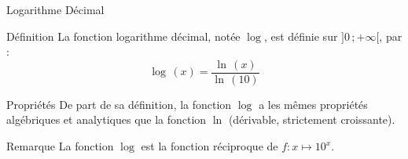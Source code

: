 \documentclass{cours}
\begin{document}
    \begin{Gpartie}{Logarithme Décimal} 
        \begin{Spartie}{Définition} 
            La fonction logarithme décimal, notée $\log$, est définie sur $\big]0\,;+\infty\big[$, par :
            \[\log\,(x)=\frac{\ln\,(x)}{\ln\,(10)}\]
        \end{Spartie}
        \begin{Spartie}{Propriétés} 
            De part de sa définition, la fonction $\log$ a les mêmes propriétés algébriques et analytiques que la fonction $\ln$ (dérivable, strictement croissante).
        \end{Spartie}
        \begin{Spartie}{Remarque} 
            La fonction $\log$ est la fonction réciproque de $f:x\mapsto 10^x$.
        \end{Spartie}
    \end{Gpartie}
\end{document}
